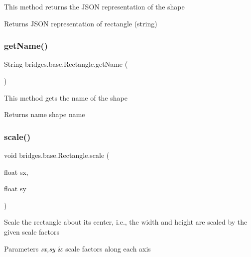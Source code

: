 This method returns the J\+S\+ON representation of the shape

\begin{DoxyReturn}{Returns}
J\+S\+ON representation of rectangle (string) 
\end{DoxyReturn}
\mbox{\label{classbridges_1_1base_1_1_rectangle_ab785b45f264ae3cd61a5a898ffa6afba}} 
\subsubsection{\texorpdfstring{get\+Name()}{getName()}}
{\footnotesize\ttfamily String bridges.\+base.\+Rectangle.\+get\+Name (\begin{DoxyParamCaption}{ }\end{DoxyParamCaption})}

This method gets the name of the shape

\begin{DoxyReturn}{Returns}
name shape name 
\end{DoxyReturn}
\mbox{\label{classbridges_1_1base_1_1_rectangle_ad2612f09cf16cd829efd13007df53f7f}} 
\subsubsection{\texorpdfstring{scale()}{scale()}}
{\footnotesize\ttfamily void bridges.\+base.\+Rectangle.\+scale (\begin{DoxyParamCaption}\item[{float}]{sx,  }\item[{float}]{sy }\end{DoxyParamCaption})}

Scale the rectangle about its center, i.\+e., the width and height are scaled by the given scale factors


\begin{DoxyParams}{Parameters}
{\em sx,sy} & scale factors along each axis \\
\hline
\end{DoxyParams}
\mbox{\label{classbridges_1_1base_1_1_rectangle_a267eafb8107ea074598fbf4d2d3dc72d}} 
